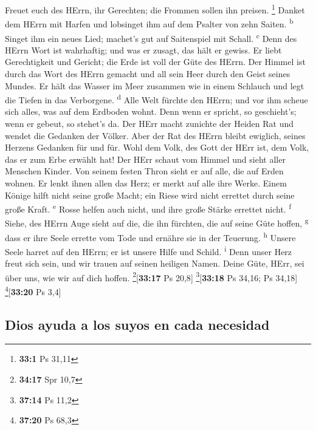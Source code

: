  Freuet euch des HErrn, ihr Gerechten; die Frommen sollen
ihn preisen. \footnote{\textbf{33:1} Ps 31,11}  Danket dem
HErrn mit Harfen und lobsinget ihm auf dem Psalter von zehn Saiten.
\textsuperscript{b}  Singet ihm ein neues Lied; machet's
gut auf Saitenspiel mit Schall. \textsuperscript{c}  Denn
des HErrn Wort ist wahrhaftig; und was er zusagt, das hält er gewiss.
 Er liebt Gerechtigkeit und Gericht; die Erde ist voll der
Güte des HErrn.  Der Himmel ist durch das Wort des HErrn
gemacht und all sein Heer durch den Geist seines Mundes. 
Er hält das Wasser im Meer zusammen wie in einem Schlauch und legt die
Tiefen in das Verborgene. \textsuperscript{d}  Alle Welt
fürchte den HErrn; und vor ihm scheue sich alles, was auf dem Erdboden
wohnt.  Denn wenn er spricht, so geschieht's; wenn er
gebeut, so stehet's da.  Der HErr macht zunichte der
Heiden Rat und wendet die Gedanken der Völker.  Aber der
Rat des HErrn bleibt ewiglich, seines Herzens Gedanken für und für.
 Wohl dem Volk, des Gott der HErr ist, dem Volk, das er
zum Erbe erwählt hat!  Der HErr schaut vom Himmel und
sieht aller Menschen Kinder.  Von seinem festen Thron
sieht er auf alle, die auf Erden wohnen.  Er lenkt ihnen
allen das Herz; er merkt auf alle ihre Werke.  Einem
Könige hilft nicht seine große Macht; ein Riese wird nicht errettet
durch seine große Kraft. \textsuperscript{e}  Rosse
helfen auch nicht, und ihre große Stärke errettet nicht.
\textsuperscript{f}  Siehe, des HErrn Auge sieht auf die,
die ihn fürchten, die auf seine Güte hoffen, \textsuperscript{g}
 dass er ihre Seele errette vom Tode und ernähre sie in
der Teuerung. \textsuperscript{h}  Unsere Seele harret
auf den HErrn; er ist unsere Hilfe und Schild. \textsuperscript{i}
 Denn unser Herz freut sich sein, und wir trauen auf
seinen heiligen Namen.  Deine Güte, HErr, sei über uns,
wie wir auf dich hoffen. \footnote{\textbf{34:17} Spr 10,7}{[}\textbf{33:17}
Ps 20,8{]} \footnote{\textbf{37:14} Ps 11,2}{[}\textbf{33:18} Ps 34,16;
Ps 34,18{]} \footnote{\textbf{37:20} Ps 68,3}{[}\textbf{33:20} Ps 3,4{]}

\hypertarget{dios-ayuda-a-los-suyos-en-cada-necesidad}{%
\subsection{Dios ayuda a los suyos en cada
necesidad}\label{dios-ayuda-a-los-suyos-en-cada-necesidad}}

